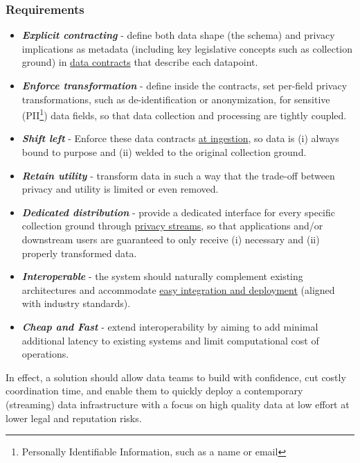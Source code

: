 \documentclass[11pt]{article} %
\begin{document}
\subsubsection{Requirements}
\begin{itemize}
  \item \textbf{\textit{Explicit contracting}} - define both data shape (the schema) and privacy implications as metadata (including key legislative concepts such as collection ground) in \underline{data contracts} that describe each datapoint. 
    \item \textbf{\textit{Enforce transformation}} - define %
    inside the contracts, set per-field privacy transformations, such as de-identification or anonymization, for sensitive (PII\footnote{Personally Identifiable Information, such as a name or email}) data fields, so that data collection and processing are tightly coupled. 
  \item \textbf{\textit{Shift left}} - Enforce these data contracts \underline{at ingestion}, so data is (i) always bound to purpose and (ii) welded to the original collection ground.
  \item \textbf{\textit{Retain utility}} - transform data in such a way that the trade-off between privacy and utility is limited or even removed. 
  \item \textbf{\textit{Dedicated distribution}} - provide a dedicated interface for every specific collection ground through \underline{privacy streams}, so that applications and/or downstream users are guaranteed to only receive (i) necessary and (ii) properly transformed data.
  \item \textbf{\textit{Interoperable}} - the system should naturally complement existing architectures and accommodate \underline{easy integration and deployment}
   (aligned with industry standards). 
  \item \textbf{\textit{Cheap and Fast}} - extend interoperability by aiming to add minimal additional latency to existing systems and limit computational cost of operations.  
\end{itemize}

In effect, a solution should allow data teams to build with confidence, cut costly coordination time, and enable them to quickly deploy a contemporary (streaming) data infrastructure with a focus on high quality data at low effort at lower legal and reputation risks. 


\end{document}
